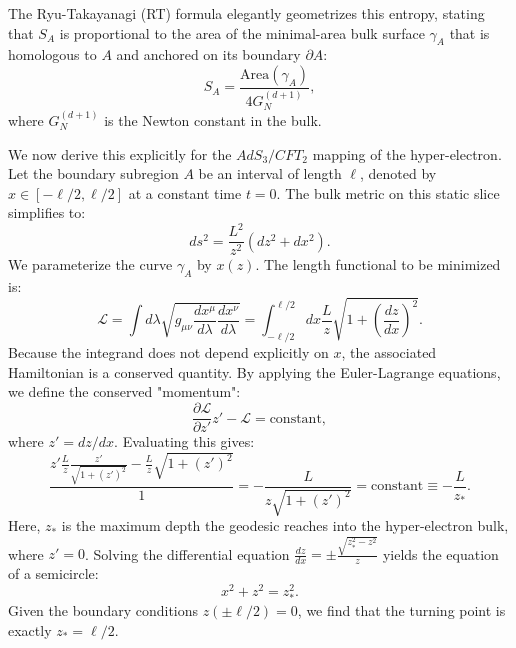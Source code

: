 The Ryu-Takayanagi (RT) formula elegantly geometrizes this entropy, stating that $S_A$ is proportional to the area of the minimal-area bulk surface $\gamma_A$ that is homologous to $A$ and anchored on its boundary $\partial A$:
\begin{equation}
    S_A = \frac{\text{Area}(\gamma_A)}{4G_N^{(d+1)}},
\end{equation}
where $G_N^{(d+1)}$ is the Newton constant in the bulk. 

We now derive this explicitly for the $AdS_3/CFT_2$ mapping of the hyper-electron. Let the boundary subregion $A$ be an interval of length $\ell$, denoted by $x \in [-\ell/2, \ell/2]$ at a constant time $t=0$. The bulk metric on this static slice simplifies to:
\begin{equation}
    ds^2 = \frac{L^2}{z^2} \left( dz^2 + dx^2 \right).
\end{equation}
We parameterize the curve $\gamma_A$ by $x(z)$. The length functional to be minimized is:
\begin{equation}
    \mathcal{L} = \int d\lambda \sqrt{g_{\mu\nu} \frac{dx^\mu}{d\lambda} \frac{dx^\nu}{d\lambda}} = \int_{-\ell/2}^{\ell/2} dx \frac{L}{z} \sqrt{1 + \left(\frac{dz}{dx}\right)^2}.
\end{equation}
Because the integrand does not depend explicitly on $x$, the associated Hamiltonian is a conserved quantity. By applying the Euler-Lagrange equations, we define the conserved "momentum":
\begin{equation}
    \frac{\partial \mathcal{L}}{\partial z'} z' - \mathcal{L} = \text{constant},
\end{equation}
where $z' = dz/dx$. Evaluating this gives:
\begin{equation}
    \frac{z' \frac{L}{z} \frac{z'}{\sqrt{1+(z')^2}} - \frac{L}{z} \sqrt{1+(z')^2}}{1} = -\frac{L}{z \sqrt{1+(z')^2}} = \text{constant} \equiv -\frac{L}{z_*}.
\end{equation}
Here, $z_*$ is the maximum depth the geodesic reaches into the hyper-electron bulk, where $z' = 0$. Solving the differential equation $\frac{dz}{dx} = \pm \frac{\sqrt{z_*^2 - z^2}}{z}$ yields the equation of a semicircle:
\begin{equation}
    x^2 + z^2 = z_*^2.
\end{equation}
Given the boundary conditions $z(\pm \ell/2) = 0$, we find that the turning point is exactly $z_* = \ell/2$.

